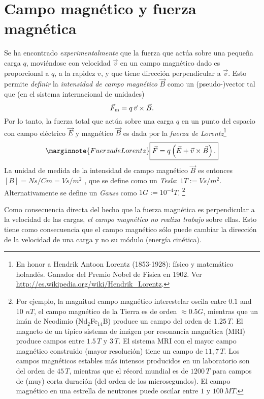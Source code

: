 \section{Campo magnético y fuerza magnética}
Se ha encontrado \textit{experimentalmente} que la fuerza que actúa sobre una pequeña carga $q$, moviéndose con velocidad $\vec{v}$ en un campo magnético dado es proporcional a $q$, a la rapidez $v$, y que tiene dirección perpendicular a $\vec{v}$. Esto permite \textit{definir}  la \textit{intensidad de campo magnético} $\vec{B}$ como un (pseudo-)vector tal que (en el sistema internacional de unidades)
\begin{equation}
 \vec{F}_{\rm m}=q\,\vec{v}\times\vec{B}.
\end{equation}
Por lo tanto, la fuerza total que actúa sobre una carga $q$ en un punto del espacio con campo eléctrico $\vec{E}$ y magnético $\vec{B}$ es dada por la \textit{fuerza de Lorentz}\footnote{En honor a Hendrik Antoon Lorentz (1853-1928): físico y matemático holandés. Ganador del Premio Nobel de Física en 1902. Ver \url{http://es.wikipedia.org/wiki/Hendrik_Lorentz}.}
\begin{equation}\marginnote{Fuerza de Lorentz}
\boxed{ \vec{F}=q\left(\vec{E}+\vec{v}\times\vec{B}\right).}
\end{equation}
La unidad de medida de la intensidad de campo magnético $\vec{B}$ es entonces  $[B]=Ns/Cm=Vs/m^2$ , que se define como un \textit{Tesla}: $1T:=Vs/m^2$. Alternativamente se define un
\textit{Gauss} como $1G:=10^{-4}T$. \footnote{Por ejemplo, la magnitud campo
magnético interestelar oscila entre $0.1$ and $10$ $nT$, el campo magnético
de la Tierra es de orden $\approx 0.5 G$, mientras que un imán
de Neodimio (Nd${}_2$Fe${}_{14}$B) produce un campo del orden de $1.25\, T$.
El magneto de un típico sistema de imágen por resonancia magnética (MRI) produce campos entre $1.5\,T$ y $3\,T$. El sistema MRI con el mayor campo magnético construido (mayor resolución) tiene un campo de $11,7\,T$. Los campos magnéticos estables más intensos producidos en un laboratorio son del orden de $45\,T$, mientras que el récord mundial es de $1200\,T$ \cite{Brecord2018} para campos de (muy) corta duración (del orden de los microsegundos). El campo magnético en una estrella de neutrones puede oscilar entre $1$ y $100\, MT$.}

Como consecuencia directa del hecho que la fuerza magnética es perpendicular a
la velocidad de las cargas, \textit{el campo magnético no realiza trabajo} sobre ellas.
Esto tiene como consecuencia que el campo magnético sólo puede cambiar la
dirección de la velocidad de una carga y no su módulo (energía cinética).

